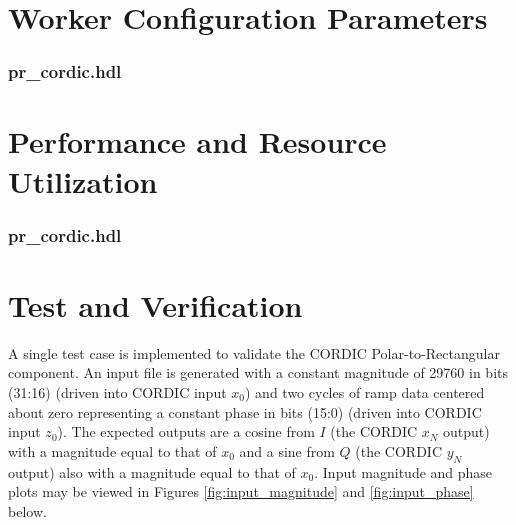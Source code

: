 \documentclass{article}
\def\comp{pr\_cordic}
\edef\ecomp{pr_cordic}
\begin{document}
\begin{landscape}
\section*{Worker Configuration Parameters}
\subsubsection*{\comp.hdl}

\section*{Performance and Resource Utilization}
\subsubsection*{\comp.hdl}

\end{landscape}
\section*{Test and Verification}
\begin{flushleft}
	A single test case is implemented to validate the CORDIC Polar-to-Rectangular component. An input file is generated with a constant magnitude of 29760 in bits (31:16) (driven into CORDIC input $x_0$) and two cycles of ramp data centered about zero representing a constant phase in bits (15:0) (driven into CORDIC input $z_0$). The expected outputs are a cosine from $I$ (the CORDIC $x_N$ output) with a magnitude equal to that of $x_0$ and a sine from $Q$ (the CORDIC $y_N$ output) also with a magnitude equal to that of $x_0$. Input magnitude and phase plots may be viewed in Figures \ref{fig:input_magnitude} and \ref{fig:input_phase} below.
\end{flushleft}
\end{document}
